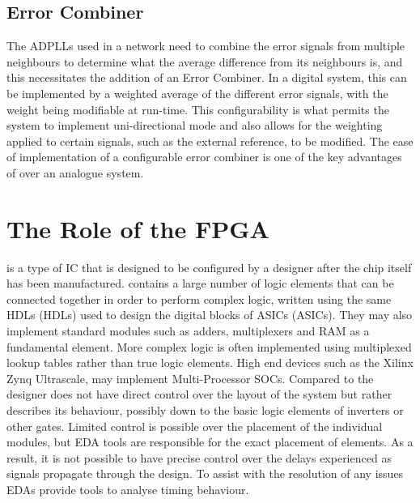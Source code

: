 \subsection{Error Combiner}
The \acp{ADPLL} used in a network need to combine the error signals from multiple neighbours to determine what the average difference from its neighbours is, and this necessitates the addition of an Error Combiner. In a digital system, this can be implemented by a weighted average of the different error signals, with the weight being modifiable at run-time. This configurability is what permits the system to implement uni-directional mode and also allows for the weighting applied to certain signals, such as the external reference, to be modified. The ease of implementation of a configurable error combiner is one of the key advantages of  over an analogue system.

\section{The Role of the FPGA}
 is a type of \ac{IC} that is designed to be configured by a designer after the chip itself has been manufactured.  contains a large number of logic elements that can be connected together in order to perform complex logic, written using the same \aclp{HDL} (\acsp{HDL}) used to design the digital blocks of \aclp{ASIC} (\acsp{ASIC}). They may also implement standard modules such as adders, multiplexers and \ac{RAM} as a fundamental element. More complex logic is often implemented using multiplexed lookup tables rather than true logic elements. High end devices such as the Xilinx Zynq Ultrascale, may implement Multi-Processor \ac{SOC}s. Compared to  the designer does not have direct control over the layout of the system but rather describes its behaviour, possibly down to the basic logic elements of inverters or other gates. Limited control is possible over the placement of the individual modules, but \ac{EDA} tools are responsible for the exact placement of elements. As a result, it is not possible to have precise control over the delays experienced as signals propagate through the design. To assist with the resolution of any issues \ac{EDA}s provide tools to analyse timing behaviour.

